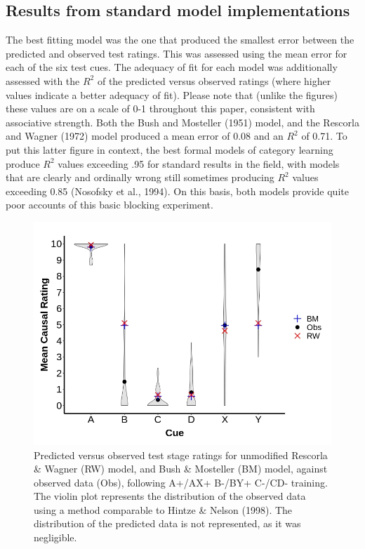 \documentclass[twocolumn]{article}
\begin{document}
\subsection{Results from standard model implementations}

The best fitting model was the one that produced the smallest error
between the predicted and observed test ratings. This was assessed using
the mean error for each of the six test cues. The adequacy of fit for
each model was additionally assessed with the $R^2$ of
the predicted versus observed ratings (where higher values indicate a
better adequacy of fit). Please note that (unlike the figures) these
values are on a scale of 0-1 throughout this paper, consistent with
associative strength. Both the Bush and Mosteller (1951) model, and the
Rescorla and Wagner (1972) model produced a mean error of 0.08 and an
$R^2$ of 0.71. To put this latter figure in context, the
best formal models of category learning produce $R^2$
values exceeding .95 for standard results in the field, with models that
are clearly and ordinally wrong still sometimes producing
$R^2$ values exceeding 0.85 (Nosofsky et al., 1994). On
this basis, both models provide quite poor accounts of this basic
blocking experiment.

\begin{figure}[t!]
\includegraphics[width=\columnwidth]{fig1.jpg}
\caption{Predicted versus observed test stage ratings for unmodified Rescorla
\& Wagner (RW) model, and Bush \& Mosteller (BM) model, against observed
data (Obs), following A+/AX+ B-/BY+ C-/CD- training. The violin plot
represents the distribution of the observed data using a method
comparable to Hintze \& Nelson (1998). The distribution of the predicted
data is not represented, as it was negligible.}
\end{figure}
\end{document}
